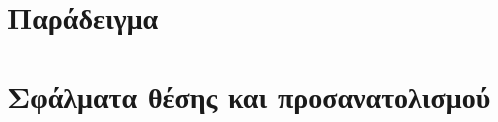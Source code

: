 \section{Παράδειγμα}
  \label{appendix:03:illustration}
  

\section{Σφάλματα θέσης και προσανατολισμού}
  \label{appendix:03:location_and_orientation_errors}
  
